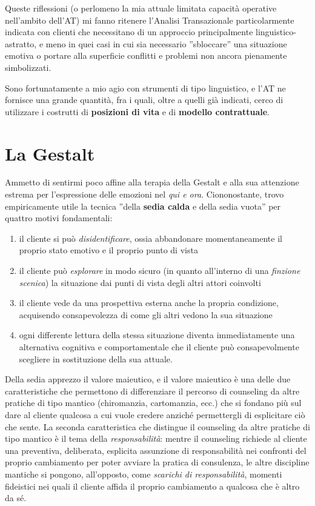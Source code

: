 Queste riflessioni (o perlomeno la mia attuale limitata capacità operative nell'ambito dell'AT) mi fanno ritenere l'Analisi Transazionale particolarmente indicata con clienti che necessitano di un approccio principalmente linguistico-astratto, e meno in quei casi in cui sia necessario ''sbloccare'' una situazione emotiva o portare alla superficie conflitti e problemi non ancora pienamente simbolizzati.

Sono fortunatamente a mio agio con strumenti di tipo linguistico, e l'AT ne fornisce una grande quantità, fra i quali, oltre a quelli già indicati, cerco di utilizzare i costrutti di \textbf{posizioni di vita} e di \textbf{modello contrattuale}.

\section{La Gestalt}
\label{sec:gestalt}
Ammetto di sentirmi poco affine alla terapia della {Gestalt} e alla sua attenzione estrema per l'espressione delle emozioni nel \emph{qui e ora}. Ciononostante, trovo empiricamente  utile la tecnica ''della \textbf{sedia calda} e della sedia vuota'' per quattro motivi fondamentali:
\begin{enumerate}
\item il cliente si può \emph{disidentificare}, ossia abbandonare momentaneamente il proprio stato emotivo e il proprio punto di vista
\item il cliente può \emph{esplorare} in modo sicuro (in quanto all'interno di una \emph{finzione scenica}) la situazione dai punti di vista degli altri attori coinvolti
\item il cliente vede da una prospettiva esterna anche la propria condizione, acquisendo consapevolezza di come gli altri vedono la sua situazione
\item ogni differente lettura della stessa situazione diventa immediatamente una alternativa cognitiva e comportamentale che il cliente può consapevolmente scegliere in sostituzione della sua attuale.
\end{enumerate}

\noindent Della sedia apprezzo il valore maieutico, e il valore maieutico è una delle due caratteristiche che permettono di differenziare il percorso di counseling da altre pratiche di tipo mantico  (chiromanzia, cartomanzia, ecc.) che si fondano più sul dare al cliente qualcosa a cui vuole credere anziché permettergli di esplicitare ciò che sente. La seconda caratteristica che distingue il counseling da altre pratiche di tipo mantico è il tema della \emph{responsabilità}: mentre il counseling richiede al cliente una preventiva, deliberata, esplicita assunzione di responsabilità nei confronti del proprio cambiamento per poter avviare la pratica di consulenza, le altre discipline mantiche si pongono, all'opposto, come \emph{scarichi di responsabilità}, momenti fideistici nei quali il cliente affida il proprio cambiamento a qualcosa che è altro da sé. 

